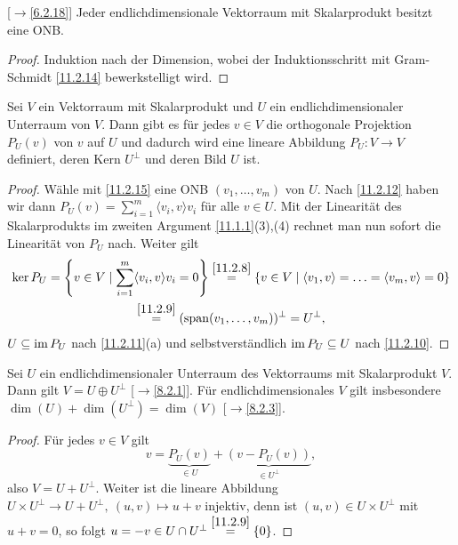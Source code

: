 \documentclass[../../main.tex]{subfiles}
\begin{document}
\begin{sat}\mbox{}{\rm[$\to$\ref{6.2.18}]}\label{11.2.15} Jeder endlichdimensionale Vektorraum mit Skalarprodukt besitzt eine ONB.
\end{sat}

\begin{proof}
Induktion nach der Dimension, wobei der Induktionsschritt mit Gram-Schmidt \ref{11.2.14} bewerkstelligt wird.
\end{proof}

\begin{kor}\label{11.2.16}
Sei $V$ ein Vektorraum mit Skalarprodukt und $U$ ein endlichdimensionaler Unterraum von $V$. Dann gibt es für jedes $v\in V$ die orthogonale Projektion $P_U(v)$
von $v$ auf $U$ und dadurch wird eine lineare Abbildung $P_U\colon V\to V$ definiert, deren Kern $U^\perp$ und deren Bild $U$ ist. 
\end{kor}

\begin{proof}
Wähle mit \ref{11.2.15} eine ONB $(v_1,\dots,v_m)$ von $U$. Nach \ref{11.2.12} haben wir dann $P_U(v)=\sum_{i=1}^m\langle v_i,v\rangle v_i$ für alle $v\in U$. Mit der Linearität
des Skalarprodukts im zweiten Argument \ref{11.1.1}(3),(4) rechnet man nun sofort die Linearität von $P_U$ nach. Weiter gilt
\begin{multline*}
\ker P_U=\left\{v\in V\mid\sum_{i=1}^m\langle v_i,v\rangle v_i=0\right\}\overset{\ref{11.2.8}}=\{v\in V\mid\langle v_1,v\rangle=\ldots=\langle v_m,v\rangle=0\}\\
\overset{\ref{11.2.9}}=(\operatorname{span}(v_1,\dots,v_m))^\perp=U^\perp,
\end{multline*}
$U\subseteq\operatorname{im} P_U$ nach \ref{11.2.11}(a) und selbstverständlich $\operatorname{im} P_U\subseteq U$ nach \ref{11.2.10}.
\end{proof}

\begin{pro}\label{11.2.17}
Sei $U$ ein endlichdimensionaler Unterraum des Vektorraums mit Skalarprodukt $V$. Dann gilt $V=U\oplus U^\perp$ {\rm[$\to$\ref{8.2.1}]}. Für endlichdimensionales $V$ gilt
insbesondere $\dim(U)+\dim(U^\perp)=\dim(V)$ {\rm[$\to$\ref{8.2.3}]}.
\end{pro}

\begin{proof}
Für jedes $v\in V$ gilt
\[v=\underbrace{P_U(v)}_{\in U}+\underbrace{(v-P_U(v))}_{\in U^\perp},\]
also $V=U+U^\perp$. Weiter ist die lineare Abbildung
$U\times U^\perp\to U+U^\perp,\ (u,v)\mapsto u+v$ injektiv, denn ist $(u,v)\in U\times U^\perp$ mit $u+v=0$, so folgt
$u=-v\in U\cap U^\perp\overset{\ref{11.2.9}}=\{0\}$.
\end{proof}
\end{document}
